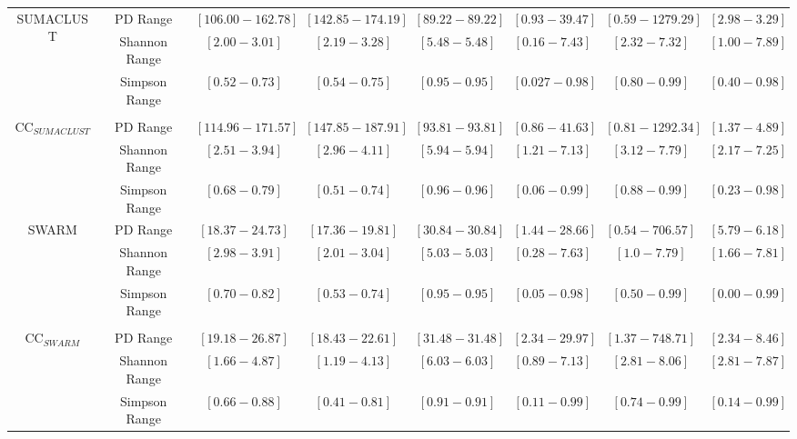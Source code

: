 \documentclass[10pt, conference, compsocconf]{IEEEtran}
\begin{document}
\begin{table}[t]
{\begin{tabular}{|c|c c c c| c c c|}
			\hline
			
			\multirow{3}{*}{SUMACLUST} & PD Range & $\left[106.00-162.78\right]$ & $\left[142.85-174.19\right]$ & $\left[89.22-89.22\right]$ & $\left[0.93-39.47\right]$ & $\left[0.59-1279.29\right]$ & $\left[2.98-3.29\right]$\\
			& Shannon Range & $\left[2.00-3.01\right]$ & $\left[2.19-3.28\right]$ & $\left[5.48-5.48\right]$ & $\left[0.16-7.43\right]$ & $\left[2.32-7.32\right]$ & $\left[1.00-7.89\right]$\\
			& Simpson Range & $\left[0.52-0.73\right]$ & $\left[0.54-0.75\right]$ & $\left[0.95-0.95\right]$ & $\left[0.027-0.98\right]$ & $\left[0.80-0.99\right]$ & $\left[0.40-0.98\right]$\\
			
			& & & & & & & \\
			
			\multirow{3}{*}{CC$_{SUMACLUST}$} & PD Range & $\left[114.96-171.57\right]$ & $\left[147.85-187.91\right]$ & $\left[93.81-93.81\right]$ & $\left[0.86-41.63\right]$ & $\left[0.81-1292.34\right]$ & $\left[1.37-4.89\right]$\\
			& Shannon Range & $\left[2.51-3.94\right]$ & $\left[2.96-4.11\right]$ & $\left[5.94-5.94\right]$ & $\left[1.21-7.13\right]$ & $\left[3.12-7.79\right]$ & $\left[2.17-7.25\right]$\\
			& Simpson Range & $\left[0.68-0.79\right]$ & $\left[0.51-0.74\right]$ & $\left[0.96-0.96\right]$ & $\left[0.06-0.99\right]$ & $\left[0.88-0.99\right]$ & $\left[0.23-0.98\right]$\\
			
			\hline
			
			\multirow{3}{*}{SWARM} & PD Range & $\left[18.37-24.73\right]$ & $\left[17.36-19.81\right]$ & $\left[30.84-30.84\right]$ & $\left[1.44-28.66\right]$ & $\left[0.54-706.57\right]$ & $\left[5.79-6.18\right]$\\ 
			& Shannon Range & $\left[2.98-3.91\right]$ & $\left[2.01-3.04\right]$ & $\left[5.03-5.03\right]$ & $\left[0.28-7.63\right]$ & $\left[1.0-7.79\right]$ & $\left[1.66-7.81\right]$\\
			& Simpson Range & $\left[0.70-0.82\right]$ & $\left[0.53-0.74\right]$ & $\left[0.95-0.95\right]$ & $\left[0.05-0.98\right]$ & $\left[0.50-0.99\right]$ & $\left[0.00-0.99\right]$\\
			
			& & & & & & & \\
			
			\multirow{3}{*}{CC$_{SWARM}$} & PD Range & $\left[19.18-26.87\right]$ & $\left[18.43-22.61\right]$ & $\left[31.48-31.48\right]$ & $\left[2.34-29.97\right]$ & $\left[1.37-748.71\right]$ & $\left[2.34-8.46\right]$\\
			& Shannon Range & $\left[1.66-4.87\right]$ & $\left[1.19-4.13\right]$ & $\left[6.03-6.03\right]$ & $\left[0.89-7.13\right]$ & $\left[2.81-8.06\right]$ & $\left[2.81-7.87\right]$\\
			& Simpson Range & $\left[0.66-0.88\right]$ & $\left[0.41-0.81\right]$ & $\left[0.91-0.91\right]$ & $\left[0.11-0.99\right]$ & $\left[0.74-0.99\right]$ & $\left[0.14-0.99\right]$\\
			

\end{tabular}}
\end{table}
\end{document}
